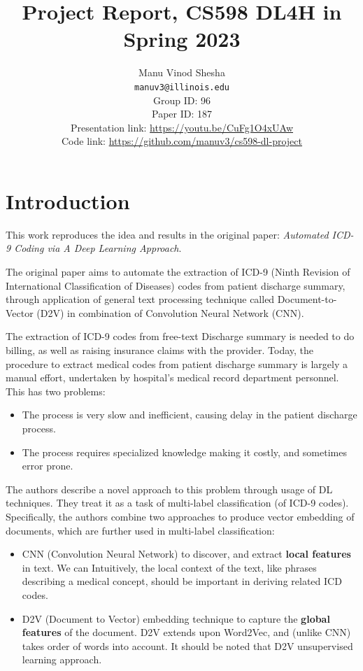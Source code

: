 \documentclass[11pt,a4paper]{article}
\title{Project Report, CS598 DL4H in Spring 2023}
\author{Manu Vinod Shesha \\
  \texttt{manuv3@illinois.edu}
  \\[2em]
  Group ID: 96\\
  Paper ID: 187\\
  Presentation link: \url{https://youtu.be/CuFg1O4xUAw} \\
  Code link: \url{https://github.com/manuv3/cs598-dl-project}}
\begin{document}
\maketitle


\section{Introduction}

This work reproduces the idea and results in the original paper: \textit{Automated ICD-9 Coding via A Deep Learning Approach}\cite{8320340}.

The original paper aims to automate the extraction of ICD-9 (Ninth Revision of International Classification of Diseases) codes from patient discharge summary, through application of general text processing technique called Document-to-Vector (D2V) in combination of Convolution Neural Network (CNN).

The extraction of ICD-9 codes from free-text Discharge summary is needed to do billing, as well as raising insurance claims with the provider. Today, the procedure to extract medical codes from patient discharge summary is largely a manual effort, undertaken by hospital’s medical record department personnel. This has two problems:
\begin{itemize}
    \item The process is very slow and inefficient, causing delay in the patient discharge process.
    \item The process requires specialized knowledge making it costly, and sometimes error prone.
\end{itemize}

The authors describe a novel approach to this problem through usage of DL techniques. They treat it as a task of multi-label classification (of ICD-9 codes). Specifically, the authors combine two approaches to produce vector embedding of documents, which are further used in multi-label classification:
\begin{itemize}
    \item CNN (Convolution Neural Network) to discover, and extract \textbf{local features} in text. We can Intuitively, the local context of the text, like phrases describing a medical concept, should be important in deriving related ICD codes.
    \item D2V (Document to Vector) \cite{le2014distributed} embedding technique to capture the \textbf{global features} of the document. D2V extends upon Word2Vec, and (unlike CNN) takes order of words into account. It should be noted that D2V unsupervised learning approach.
\end{itemize}
\end{document}
